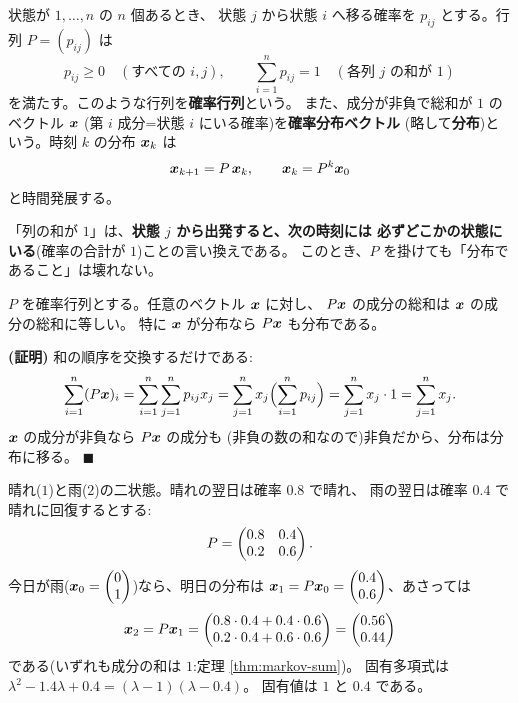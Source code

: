 \begin{teigi}[確率行列と確率分布ベクトル]\label{def:markov}
状態が $1, \dots, n$ の $n$ 個あるとき、
状態 $j$ から状態 $i$ へ移る確率を $p_{ij}$ とする。行列
$P = (p_{ij})$ は
\[
p_{ij} \ge 0 \quad (\text{すべての } i, j), \qquad
\sum_{i=1}^{n} p_{ij} = 1 \quad (\text{各列 } j \text{ の和が } 1)
\]
を満たす。このような行列を\textbf{確率行列}という。
また、成分が非負で総和が $1$ のベクトル $\bm{x}$
(第 $i$ 成分=状態 $i$ にいる確率)を\textbf{確率分布ベクトル}
(略して\textbf{分布})という。時刻 $k$ の分布 $\bm{x}_k$ は
\[
\bm{x}_{k+1} = P\,\bm{x}_k, \qquad \bm{x}_k = P^k \bm{x}_0
\]
と時間発展する。
\end{teigi}

「列の和が $1$」は、\textbf{状態 $j$ から出発すると、次の時刻には
必ずどこかの状態にいる}(確率の合計が $1$)ことの言い換えである。
このとき、$P$ を掛けても「分布であること」は壊れない。

\begin{teiri}[確率の保存]\label{thm:markov-sum}
$P$ を確率行列とする。任意のベクトル $\bm{x}$ に対し、
$P\bm{x}$ の成分の総和は $\bm{x}$ の成分の総和に等しい。
特に $\bm{x}$ が分布なら $P\bm{x}$ も分布である。
\end{teiri}

\noindent\textbf{(証明)}\quad
和の順序を交換するだけである:
\[
\sum_{i=1}^{n} (P\bm{x})_i
= \sum_{i=1}^{n} \sum_{j=1}^{n} p_{ij} x_j
= \sum_{j=1}^{n} x_j \Bigl(\sum_{i=1}^{n} p_{ij}\Bigr)
= \sum_{j=1}^{n} x_j \cdot 1
= \sum_{j=1}^{n} x_j.
\]
$\bm{x}$ の成分が非負なら $P\bm{x}$ の成分も
(非負の数の和なので)非負だから、分布は分布に移る。 $\blacksquare$

\begin{rei}[天気のマルコフ連鎖]\label{rei:markov-weather}
晴れ($1$)と雨($2$)の二状態。晴れの翌日は確率 $0.8$ で晴れ、
雨の翌日は確率 $0.4$ で晴れに回復するとする:
\[
P = \begin{pmatrix}0.8 & 0.4 \\ 0.2 & 0.6\end{pmatrix}.
\]
今日が雨($\bm{x}_0 = \begin{pmatrix}0 \\ 1\end{pmatrix}$)なら、明日の分布は
$\bm{x}_1 = P\bm{x}_0 = \begin{pmatrix}0.4 \\ 0.6\end{pmatrix}$、あさっては
\[
\bm{x}_2 = P\bm{x}_1
= \begin{pmatrix}0.8 \cdot 0.4 + 0.4 \cdot 0.6 \\ 0.2 \cdot 0.4 + 0.6 \cdot 0.6\end{pmatrix}
= \begin{pmatrix}0.56 \\ 0.44\end{pmatrix}
\]
である(いずれも成分の和は $1$:定理 \ref{thm:markov-sum})。
固有多項式は $\lambda^2 - 1.4\lambda + 0.4 = (\lambda - 1)(\lambda - 0.4)$。
固有値は $1$ と $0.4$ である。
\end{rei}

